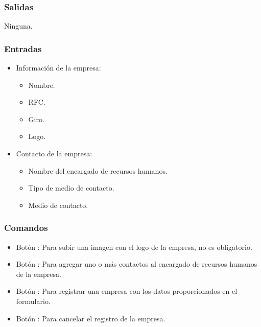 

\subsubsection{Salidas}
	\noindent
	Ninguna.

\subsubsection{Entradas}
	\begin{itemize}
		\item Información de la empresa:
		\begin{itemize}
			\item Nombre.
			\item RFC.
			\item Giro.
			\item Logo.
		\end{itemize}
		\item Contacto de la empresa:
		\begin{itemize}
			\item Nombre del encargado de recursos humanos.
			\item Tipo de medio de contacto. 
			\item Medio de contacto. 
		\end{itemize}
	\end{itemize}

\subsubsection{Comandos}
 	\begin{itemize}
		\item Botón : Para subir una imagen con el logo de la empresa, no es obligatorio.  
		\item Botón \IUbutton{+}: Para agregar uno o más contactos al encargado de recursos humanos de la empresa.
		\item Botón : Para registrar una empresa con los datos proporcionados en el formulario.
		\item Botón : Para cancelar el registro de la empresa.
	\end{itemize}




